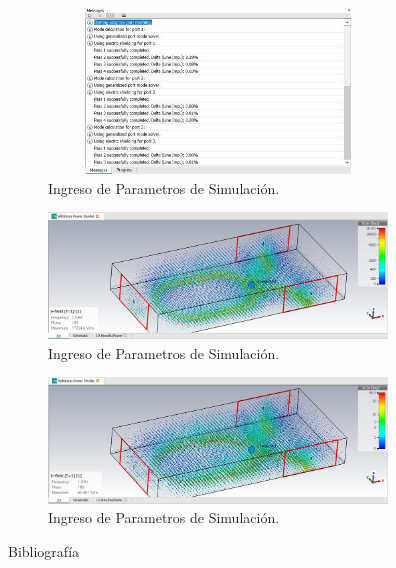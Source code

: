 \documentclass[a4paper]{IEEEtran} %
\begin{document}
\begin{figure}[h]    
    \centering
    \includegraphics[width=9cm,height=4.4cm]{imagenes/img13}
    \caption{Ingreso de Parametros de Simulación.}
    \label{fig:modelamiento8}
\end{figure}
\vspace{10mm}
\begin{figure}[h]    
    \centering
    \includegraphics[width=9cm]{imagenes/img15}
    \caption{Ingreso de Parametros de Simulación.}
    \label{fig:modelamiento9}
\end{figure}
\begin{figure}[h]    
    \centering
    \includegraphics[width=9cm]{imagenes/img16}
    \caption{Ingreso de Parametros de Simulación.}
    \label{fig:modelamiento10}
\end{figure}

Bibliografía


\end{document}
